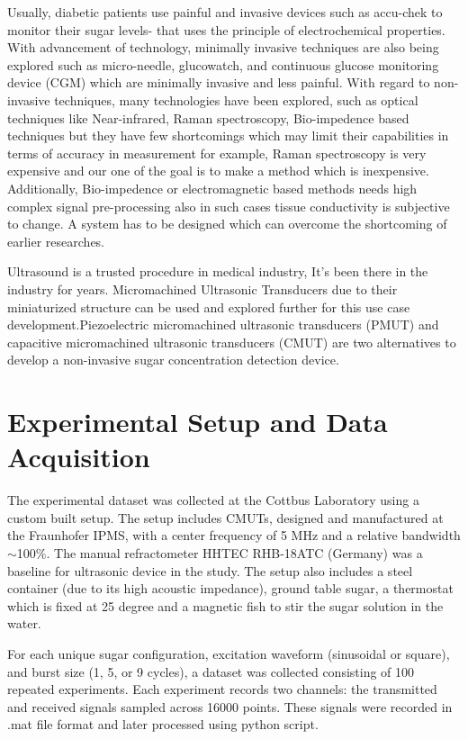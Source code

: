 \documentclass[runningheads]{llncs}
\begin{document}
Usually, diabetic patients use painful and invasive devices such as accu-chek to monitor their sugar levels- that uses the principle of electrochemical properties. With advancement of technology, minimally invasive techniques are also being explored such as micro-needle, glucowatch, and continuous glucose monitoring device (CGM) which are minimally invasive and less painful. With regard to non-invasive techniques, many technologies have been explored, such as optical techniques like Near-infrared, Raman spectroscopy, Bio-impedence based techniques but they have few shortcomings which may limit their capabilities in terms of accuracy in measurement for example, Raman spectroscopy is very expensive and our one of the goal is to make a method which is inexpensive. Additionally, Bio-impedence or electromagnetic based methods needs high complex signal pre-processing also in such cases tissue conductivity is subjective to change. A system has to be designed which can overcome the shortcoming of earlier researches. 
\vspace{1em}  %

Ultrasound is a trusted procedure in medical industry, It's been there in the industry for years. Micromachined Ultrasonic Transducers due to their miniaturized structure can be used and explored further for this use case development.Piezoelectric micromachined ultrasonic transducers (PMUT) and capacitive micromachined ultrasonic transducers (CMUT) are two alternatives to develop a non-invasive sugar concentration detection device.

\section{Experimental Setup and Data Acquisition}
The experimental dataset was collected at the Cottbus Laboratory using a custom built setup. The setup includes CMUTs, designed and manufactured at the Fraunhofer IPMS, with a center frequency of 5 MHz and a relative bandwidth $\sim$100\%. The manual refractometer HHTEC RHB-18ATC (Germany) was a baseline for ultrasonic device in the study. The setup also includes a steel container (due to its high acoustic impedance)\cite{citation4}, ground table sugar, a thermostat which is fixed at 25 degree and a magnetic fish to stir the sugar solution in the water.
\vspace{1em}  %

For each unique sugar configuration, excitation waveform (sinusoidal or square), and burst size (1, 5, or 9 cycles), a dataset was collected consisting of 100 repeated experiments. Each experiment records two channels: the transmitted and received signals sampled across 16000 points. These signals were recorded in .mat file format and later processed using python script.
\end{document}
